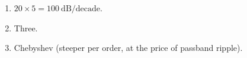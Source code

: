 \begin{enumerate}[leftmargin=1.6em,itemsep=2pt]
\item $20\times5 = 100\ \text{dB/decade}$.
\item Three.
\item Chebyshev (steeper per order, at the price of passband ripple).
\end{enumerate}
